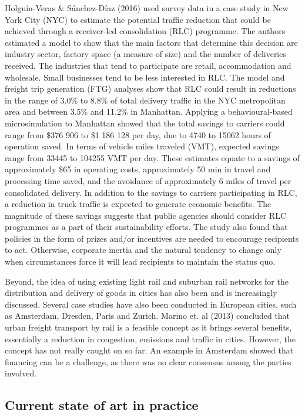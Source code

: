 \documentclass[
]{book}
\begin{document}
Holguín-Veras \& Sánchez-Díaz (2016) used survey data in a case study in New York City (NYC) to estimate the potential traffic reduction that could be achieved through a receiver-led consolidation (RLC) programme. The authors estimated a model to show that the main factors that determine this decision are industry sector, factory space (a measure of size) and the number of deliveries received. The industries that tend to participate are retail, accommodation and wholesale. Small businesses tend to be less interested in RLC. The model and freight trip generation (FTG) analyses show that RLC could result in reductions in the range of 3.0\% to 8.8\% of total delivery traffic in the NYC metropolitan area and between 3.5\% and 11.2\% in Manhattan. Applying a behavioural-based microsimulation to Manhattan showed that the total savings to carriers could range from \$376 906 to \$1 186 128 per day, due to 4740 to 15062 hours of operation saved. In terms of vehicle miles traveled (VMT), expected savings range from 33445 to 104255 VMT per day. These estimates equate to a savings of approximately \$65 in operating costs, approximately 50 min in travel and processing time saved, and the avoidance of approximately 6 miles of travel per consolidated delivery. In addition to the savings to carriers participating in RLC, a reduction in truck traffic is expected to generate economic benefits. The magnitude of these savings suggests that public agencies should consider RLC programmes as a part of their sustainability efforts. The study also found that policies in the form of prizes and/or incentives are needed to encourage recipients to act. Otherwise, corporate inertia and the natural tendency to change only when circumstances force it will lead recipients to maintain the status quo.

Beyond, the idea of using existing light rail and suburban rail networks for the distribution and delivery of goods in cities has also been and is increasingly discussed. Several case studies have also been conducted in European cities, such as Amsterdam, Dresden, Paris and Zurich. Marino et. al (2013) concluded that urban freight transport by rail is a feasible concept as it brings several benefits, essentially a reduction in congestion, emissions and traffic in cities. However, the concept has not really caught on so far. An example in Amsterdam showed that financing can be a challenge, as there was no clear consensus among the parties involved.

\hypertarget{current-state-of-art-in-practice-30}{%
\subsection*{Current state of art in practice}\label{current-state-of-art-in-practice-30}}
\end{document}
